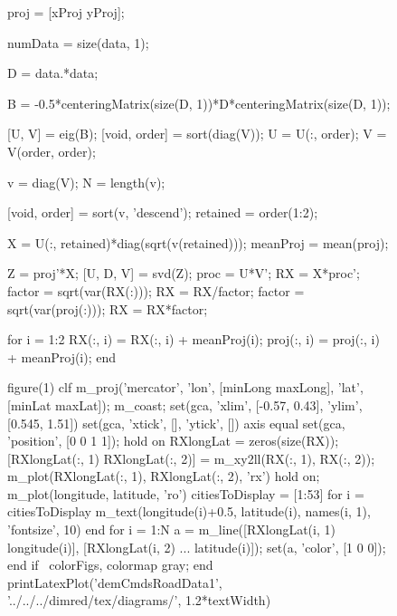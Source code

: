 \begin{figure}
\begin{octave}
    proj = [xProj yProj];

    numData = size(data, 1);

    D = data.*data;

    B = -0.5*centeringMatrix(size(D, 1))*D*centeringMatrix(size(D, 1));

    [U, V] = eig(B);
    [void, order] = sort(diag(V));
    U = U(:, order);
    V = V(order, order);
    
    v = diag(V);
    N = length(v);

    [void, order] = sort(v, 'descend');
    retained = order(1:2);

    X = U(:, retained)*diag(sqrt(v(retained)));
    meanProj = mean(proj);


    Z = proj'*X;
    [U, D, V] = svd(Z);
    proc = U*V';
    RX = X*proc';
    factor = sqrt(var(RX(:)));
    RX = RX/factor;
    factor = sqrt(var(proj(:)));
    RX = RX*factor;

    for i = 1:2
      RX(:, i) = RX(:, i) + meanProj(i);
      proj(:, i) = proj(:, i) + meanProj(i);
    end

    figure(1)
    clf
    m_proj('mercator', 'lon', [minLong maxLong], 'lat', [minLat maxLat]);
    m_coast;
    set(gca, 'xlim', [-0.57, 0.43], 'ylim', [0.545, 1.51])
    set(gca, 'xtick', [], 'ytick', [])
    axis equal
    set(gca, 'position', [0 0 1 1]);
    hold on
    RXlongLat = zeros(size(RX));
    [RXlongLat(:, 1) RXlongLat(:, 2)] = m_xy2ll(RX(:, 1), RX(:, 2));
    m_plot(RXlongLat(:, 1), RXlongLat(:, 2), 'rx')
    hold on;
    m_plot(longitude, latitude, 'ro')
    citiesToDisplay = [1:53] %
    for i = citiesToDisplay
      m_text(longitude(i)+0.5, latitude(i), names(i, 1), 'fontsize', 10)
    end
    for i = 1:N
      a = m_line([RXlongLat(i, 1) longitude(i)], [RXlongLat(i, 2) ...
                  latitude(i)]);
      set(a, 'color', [1 0 0]);
    end
    if ~colorFigs, colormap gray; end
    printLatexPlot('demCmdsRoadData1', '../../../dimred/tex/diagrams/', 1.2*textWidth)



\end{octave}
\end{figure}
